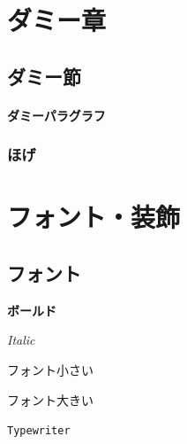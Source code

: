 \documentclass[11pt,a4paper, titlepage]{ltjsarticle}
\let\origsection\section
\let\origsubsection\subsection
\newcommand{\chapter}{\origsection}
\renewcommand{\section}{\origsubsection}
\renewcommand{\subsection}{\subsubsection}
\newcommand{\記}{\begin{center} 記 \end{center}}
\newcommand{\挨拶}{\noindent 拝啓 \ifcase\month\or 厳寒\or 春寒\or 早春
    \or 陽寒\or 新緑\or 向暑\or 猛暑\or 残暑\or 初秋\or 仲秋\or 晩秋\or 初冬
    \fi の候, ますますご清栄のこととお喜び申し上げます.}
\begin{document}
\begin{abstract}
    \lipsum[1-2]
\end{abstract}

\tableofcontents
\newpage
\listoffigures
\newpage
\listoftables
\newpage
\makeatletter
{}
\makeatother
\chapter{ダミー章}
\lipsum[1-5]
\section{ダミー節 \label{sec:1}}
\lipsum[6-20]
\lipsum[21-25]
\paragraph{ダミーパラグラフ}
\lipsum[20]
\subsection{ほげ}

\chapter{フォント・装飾}
\section{フォント}
\textbf{ボールド} \par
\textit{Italic} \par
\small{フォント小さい} \par
\large{フォント大きい} \par
{} \par
\texttt{Typewriter} \par
{} \par
{} \par
\end{document}
